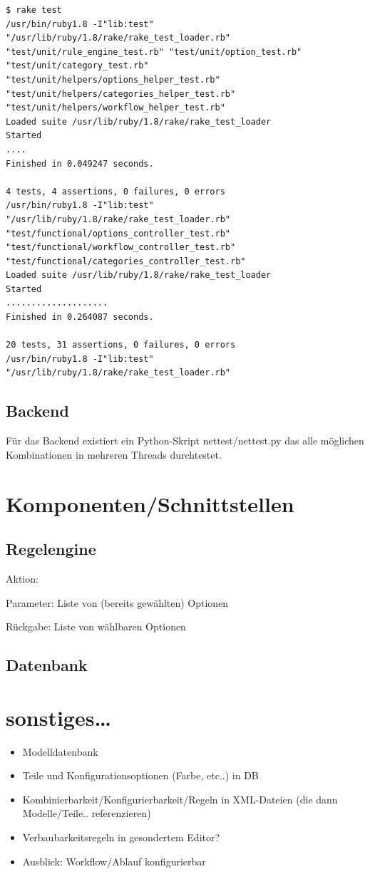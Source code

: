 \documentclass[a4paper,10pt]{article}
\begin{document}
\begin{lstlisting}
$ rake test
/usr/bin/ruby1.8 -I"lib:test" "/usr/lib/ruby/1.8/rake/rake_test_loader.rb" "test/unit/rule_engine_test.rb" "test/unit/option_test.rb" "test/unit/category_test.rb" "test/unit/helpers/options_helper_test.rb" "test/unit/helpers/categories_helper_test.rb" "test/unit/helpers/workflow_helper_test.rb" 
Loaded suite /usr/lib/ruby/1.8/rake/rake_test_loader
Started
....
Finished in 0.049247 seconds.

4 tests, 4 assertions, 0 failures, 0 errors
/usr/bin/ruby1.8 -I"lib:test" "/usr/lib/ruby/1.8/rake/rake_test_loader.rb" "test/functional/options_controller_test.rb" "test/functional/workflow_controller_test.rb" "test/functional/categories_controller_test.rb" 
Loaded suite /usr/lib/ruby/1.8/rake/rake_test_loader
Started
....................
Finished in 0.264087 seconds.

20 tests, 31 assertions, 0 failures, 0 errors
/usr/bin/ruby1.8 -I"lib:test" "/usr/lib/ruby/1.8/rake/rake_test_loader.rb"  
\end{lstlisting}

\subsection{Backend}
Für das Backend existiert ein Python-Skript nettest/nettest.py das alle möglichen Kombinationen in mehreren Threads durchtestet.

\section{Komponenten/Schnittstellen}

\subsection*{Regelengine}

Aktion:
 

Parameter:
 Liste von (bereits gewählten) Optionen

Rückgabe:
 Liste von wählbaren Optionen

\subsection*{Datenbank}


\section{sonstiges\ldots}
\begin{itemize}
 \item Modelldatenbank
 \item Teile und Konfigurationsoptionen (Farbe, etc..) in DB
 \item Kombinierbarkeit/Konfigurierbarkeit/Regeln in XML-Dateien (die dann Modelle/Teile.. referenzieren)
 \item Verbaubarkeitsregeln in gesondertem Editor?
 \item Ausblick: Workflow/Ablauf konfigurierbar
\end{itemize}
\end{document}
